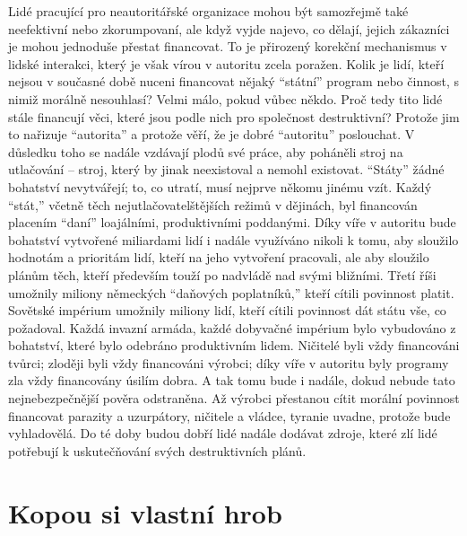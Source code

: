 \documentclass{book}
\begin{document}
Lidé pracující pro neautoritářské organizace mohou být samozřejmě také neefektivní nebo zkorumpovaní, ale když vyjde najevo, co dělají, jejich zákazníci je mohou jednoduše přestat financovat. To je přirozený korekční mechanismus v lidské interakci, který je však vírou v autoritu zcela poražen. Kolik je lidí, kteří nejsou v současné době nuceni financovat nějaký \enquote{státní} program nebo činnost, s nimiž morálně nesouhlasí? Velmi málo, pokud vůbec někdo. Proč tedy tito lidé stále financují věci, které jsou podle nich pro společnost destruktivní? Protože jim to nařizuje \enquote{autorita} a protože věří, že je dobré \enquote{autoritu} poslouchat. V důsledku toho se nadále vzdávají plodů své práce, aby poháněli stroj na utlačování -- stroj, který by jinak neexistoval a nemohl existovat. \enquote{Státy} žádné bohatství nevytvářejí; to, co utratí, musí nejprve někomu jinému vzít. Každý \enquote{stát,} včetně těch nejutlačovatelštějších režimů v dějinách, byl financován placením \enquote{daní} loajálními, produktivními poddanými. Díky víře v autoritu bude bohatství vytvořené miliardami lidí i nadále využíváno nikoli k tomu, aby sloužilo hodnotám a prioritám lidí, kteří na jeho vytvoření pracovali, ale aby sloužilo plánům těch, kteří především touží po nadvládě nad svými bližními. Třetí říši umožnily miliony německých \enquote{daňových poplatníků,} kteří cítili povinnost platit. Sovětské impérium umožnily miliony lidí, kteří cítili povinnost dát státu vše, co požadoval. Každá invazní armáda, každé dobyvačné impérium bylo vybudováno z bohatství, které bylo odebráno produktivním lidem. Ničitelé byli vždy financováni tvůrci; zloději byli vždy financováni výrobci; díky víře v autoritu byly programy zla vždy financovány úsilím dobra. A tak tomu bude i nadále, dokud nebude tato nejnebezpečnější pověra odstraněna. Až výrobci přestanou cítit morální povinnost financovat parazity a uzurpátory, ničitele a vládce, tyranie uvadne, protože bude vyhladovělá. Do té doby budou dobří lidé nadále dodávat zdroje, které zlí lidé potřebují k uskutečňování svých destruktivních plánů.

\section{Kopou si vlastní hrob}
\end{document}
